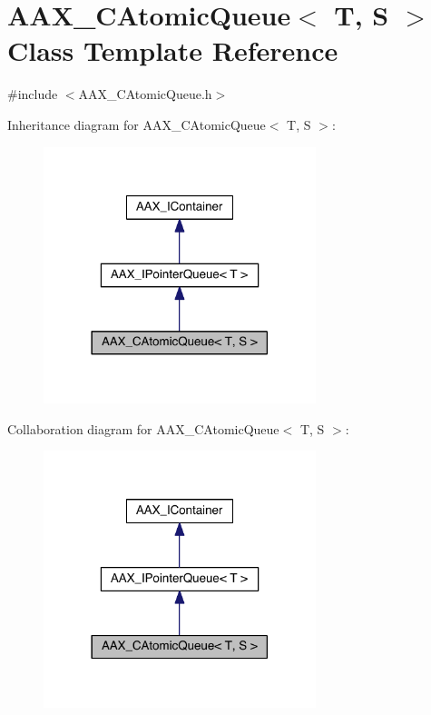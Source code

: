 \hypertarget{a00010}{}\section{A\+A\+X\+\_\+\+C\+Atomic\+Queue$<$ T, S $>$ Class Template Reference}
\label{a00010}


{\ttfamily \#include $<$A\+A\+X\+\_\+\+C\+Atomic\+Queue.\+h$>$}



Inheritance diagram for A\+A\+X\+\_\+\+C\+Atomic\+Queue$<$ T, S $>$\+:
\nopagebreak
\begin{figure}[H]
\begin{center}
\leavevmode
\includegraphics[width=225pt]{a00392}
\end{center}
\end{figure}


Collaboration diagram for A\+A\+X\+\_\+\+C\+Atomic\+Queue$<$ T, S $>$\+:
\nopagebreak
\begin{figure}[H]
\begin{center}
\leavevmode
\includegraphics[width=225pt]{a00393}
\end{center}
\end{figure}



